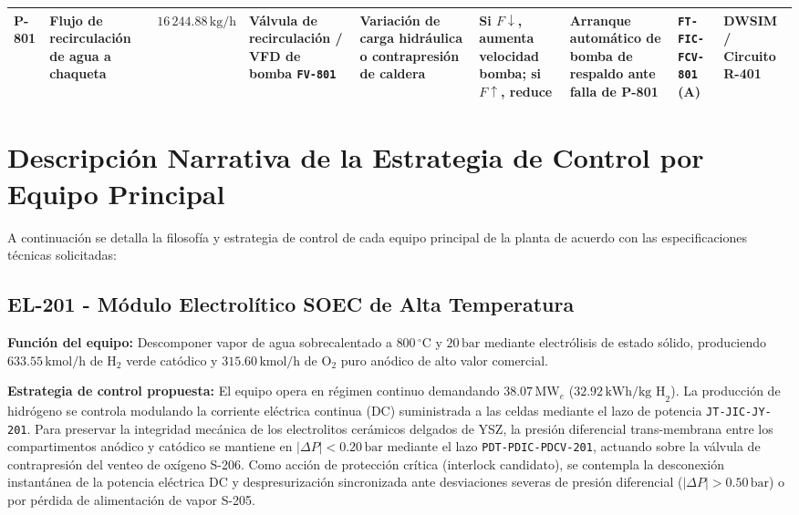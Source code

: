 \documentclass[10pt,letterpaper]{article}
\begin{document}
\begin{landscape}
\begin{longtable}{|p{1.4cm}|p{2.3cm}|p{2.0cm}|p{2.9cm}|p{2.8cm}|p{3.0cm}|p{3.4cm}|p{2.5cm}|p{1.5cm}|}
P-801 & Flujo de recirculación de agua a chaqueta & $16\,244.88\,\text{kg/h}$ & Válvula de recirculación / VFD de bomba \texttt{FV-801} & Variación de carga hidráulica o contrapresión de caldera & Si $F \downarrow$, aumenta velocidad bomba; si $F \uparrow$, reduce & Arranque automático de bomba de respaldo ante falla de P-801 & \texttt{FT-FIC-FCV-801} (A) & DWSIM / Circuito R-401 \\ \hline

\end{longtable}
\end{landscape}

\newpage
\section{Descripción Narrativa de la Estrategia de Control por Equipo Principal}
A continuación se detalla la filosofía y estrategia de control de cada equipo principal de la planta de acuerdo con las especificaciones técnicas solicitadas:

\subsection{EL-201 - Módulo Electrolítico SOEC de Alta Temperatura}
\textbf{Función del equipo:} Descomponer vapor de agua sobrecalentado a $800\,^\circ\text{C}$ y $20\,\text{bar}$ mediante electrólisis de estado sólido, produciendo $633.55\,\text{kmol/h}$ de $\text{H}_2$ verde catódico y $315.60\,\text{kmol/h}$ de $\text{O}_2$ puro anódico de alto valor comercial.

\textbf{Estrategia de control propuesta:} El equipo opera en régimen continuo demandando $38.07\,\text{MW}_e$ ($32.92\,\text{kWh/kg H}_2$). La producción de hidrógeno se controla modulando la corriente eléctrica continua (DC) suministrada a las celdas mediante el lazo de potencia \texttt{JT-JIC-JY-201}. Para preservar la integridad mecánica de los electrolitos cerámicos delgados de YSZ, la presión diferencial trans-membrana entre los compartimentos anódico y catódico se mantiene en $|\Delta P| < 0.20\,\text{bar}$ mediante el lazo \texttt{PDT-PDIC-PDCV-201}, actuando sobre la válvula de contrapresión del venteo de oxígeno S-206. Como acción de protección crítica (interlock candidato), se contempla la desconexión instantánea de la potencia eléctrica DC y despresurización sincronizada ante desviaciones severas de presión diferencial ($|\Delta P| > 0.50\,\text{bar}$) o por pérdida de alimentación de vapor S-205.
\end{document}

